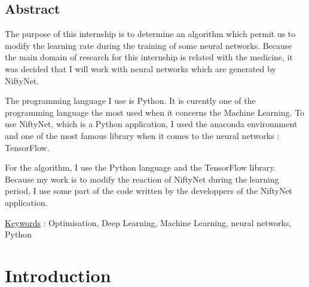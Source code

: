 \documentclass{book}
\newcommand{\p}{\vspace{0.2cm}}
\begin{document}
	\section*{Abstract}

		The purpose of this internship is to determine an algorithm which permit us to modify the learning rate during the training of some neural networks. Because the main domain of research for this internship is related with the medicine, it was decided that I will work with neural networks which are generated by NiftyNet.\p

		The programming language I use is Python. It is curently one of the programming language the most used when it concerns the Machine Learning. To use NiftyNet, which is a Python application, I used the anaconda environnment and one of the most famous library when it comes to the neural networks : TensorFlow.

		For the algorithm, I use the Python language and the TensorFlow library. Because my work is to modify the reaction of NiftyNet during the learning period, I use some part of the code written by the developpers of the NiftyNet application.\p

		\ul{Keywords} : Optimisation, Deep Learning, Machine Learning, neural networks, Python

	\setcounter{tocdepth}{3}
	\renewcommand{\contentsname}{Table des matières}
	\tableofcontents

	\clearpage

	\begingroup
	\let\clearpage\relax
	\listoftables
	\listoffigures
	\endgroup

	\clearpage

	\chapter*{Introduction}
\end{document}
